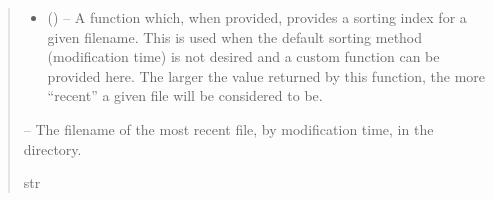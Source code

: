 \documentclass[letterpaper,11pt,english]{sphinxmanual}
\begin{document}
\begin{savenotes}
\begin{fulllineitems}
\begin{quote}
\begin{description}
\begin{itemize}
\item {} 
\sphinxAtStartPar
{} (\sphinxstyleliteralemphasis{\sphinxupquote{, }}) – A function which, when provided, provides a sorting index for a given
filename. This is used when the default sorting method (modification
time) is not desired and a custom function can be provided here. The
larger the value returned by this function, the more “recent” a
given file will be considered to be.

\end{itemize}

\sphinxAtStartPar
{} – The filename of the most recent file, by modification time, in the
directory.

\sphinxAtStartPar
str

\end{description}\end{quote}

\end{fulllineitems}\end{savenotes}

\end{document}
